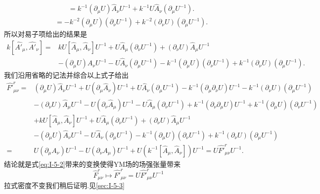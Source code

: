 \documentclass[../main.tex]{subfiles}
\begin{document}
 \begin{align*}
 [k^{-1}(\partial_\mu U)U^{-1},U \hat{A}_\nu U^{-1}] &=  k ^{-1}(\partial_\mu U) \hat{A}_\nu U^{-1} + k^{-1}U \hat{A}_\nu (\partial_\mu U^{-1}) 
 .\end{align*}
 \begin{align*}
 [k^{-1}(\partial_\mu U)U^{-1},k^{-1}(\partial_\nu U)U^{-1}] &= -k^{-2} (\partial_\mu U) (\partial_\nu U^{-1}) + k ^{-2}(\partial_\nu U)(\partial_\mu U^{-1}) 
 .\end{align*}
 所以对易子项给出的结果是
 \begin{align*}
 k [\hat{A'}_\mu ,\hat{A'}_\nu]  =& k U[\hat{A}_\mu, \hat{A}_\nu]U^{-1} +  U \hat{A}_\mu (\partial_\nu U^{-1}) + (\partial_\nu U) \hat{A}_\mu U^{-1}\\
                                  & - (\partial_\mu U) \hat{A}_\nu U^{-1} - U \hat{A}_\nu (\partial_\mu U^{-1}) -k^{-1} (\partial_\mu U) (\partial_\nu U^{-1}) + k ^{-1}(\partial_\nu U)(\partial_\mu U^{-1})
 .\end{align*}
 我们沿用省略的记法并综合以上式子给出
 \begin{align*}
 \hat{F'}^r_{\mu\nu} = &(\partial_\mu U)\hat{A}_\nu U^{-1} + U (\partial_\mu \hat{A}_\nu )U^{-1} + U \hat{A}_\nu(\partial_\mu U^{-1}) - k^{-1}(\partial_\mu \partial_\nu U) U^{-1} - k^{-1} (\partial_\nu U)(\partial_\mu U^{-1}) \\
                 &  - (\partial_\nu U)\hat{A}_\mu U^{-1} - U (\partial_\nu \hat{A}_\mu )U^{-1} - U \hat{A}_\mu(\partial_\nu U^{-1}) + k^{-1}(\partial_\nu \partial_\mu U) U^{-1} + k^{-1} (\partial_\mu U)(\partial_\nu U^{-1}) \\
                 &+ k U[\hat{A}_\mu, \hat{A}_\nu]U^{-1} +  U \hat{A}_\mu (\partial_\nu U^{-1}) + (\partial_\nu U) \hat{A}_\mu U^{-1}\\
                  & - (\partial_\mu U) \hat{A}_\nu U^{-1} - U \hat{A}_\nu (\partial_\mu U^{-1}) -k^{-1} (\partial_\mu U) (\partial_\nu U^{-1}) + k ^{-1}(\partial_\nu U)(\partial_\mu U^{-1})\\
 =& U(\partial_\mu A_\nu) U ^{-1} - U(\partial_\nu A_\mu) U^{-1} + U (k^{-1} [\hat{A}_\mu, \hat{A}_\nu]) U^{-1}
 = U \hat{F'}^r_{\mu\nu} U^{-1}
 .\end{align*}
 结论就是式\ref{eq:I-5-2}带来的变换使得YM场的场强张量带来
 \begin{equation}
 \label{eq:I-5-8}
 \hat{F}^r_{\mu\nu} \mapsto \hat{F'}^r_{\mu\nu} = U \hat{F'}^r_{\mu\nu} U^{-1}
 \end{equation} 
 拉式密度不变我们稍后证明.见\ref{sec:I-5-3}
\end{document}
